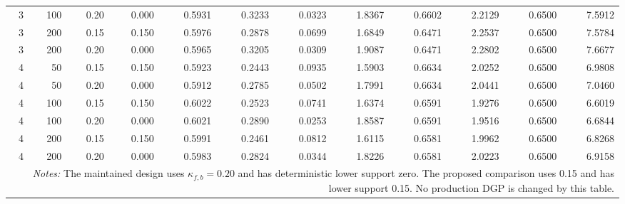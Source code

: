\begin{longtable}{rrrrrrrrrrrr}
3 & 100 & 0.20 & 0.000 & 0.5931 & 0.3233 & 0.0323 & 1.8367 & 0.6602 & 2.2129 & 0.6500 & 7.5912 \\
3 & 200 & 0.15 & 0.150 & 0.5976 & 0.2878 & 0.0699 & 1.6849 & 0.6471 & 2.2537 & 0.6500 & 7.5784 \\
3 & 200 & 0.20 & 0.000 & 0.5965 & 0.3205 & 0.0309 & 1.9087 & 0.6471 & 2.2802 & 0.6500 & 7.6677 \\
4 & 50 & 0.15 & 0.150 & 0.5923 & 0.2443 & 0.0935 & 1.5903 & 0.6634 & 2.0252 & 0.6500 & 6.9808 \\
4 & 50 & 0.20 & 0.000 & 0.5912 & 0.2785 & 0.0502 & 1.7991 & 0.6634 & 2.0441 & 0.6500 & 7.0460 \\
4 & 100 & 0.15 & 0.150 & 0.6022 & 0.2523 & 0.0741 & 1.6374 & 0.6591 & 1.9276 & 0.6500 & 6.6019 \\
4 & 100 & 0.20 & 0.000 & 0.6021 & 0.2890 & 0.0253 & 1.8587 & 0.6591 & 1.9516 & 0.6500 & 6.6844 \\
4 & 200 & 0.15 & 0.150 & 0.5991 & 0.2461 & 0.0812 & 1.6115 & 0.6581 & 1.9962 & 0.6500 & 6.8268 \\
4 & 200 & 0.20 & 0.000 & 0.5983 & 0.2824 & 0.0344 & 1.8226 & 0.6581 & 2.0223 & 0.6500 & 6.9158 \\
\bottomrule
\multicolumn{12}{p{0.96\linewidth}}{\footnotesize \textit{Notes:} The maintained design uses $\kappa_{f,b}=0.20$ and has deterministic lower support zero. The proposed comparison uses 0.15 and has lower support 0.15. No production DGP is changed by this table.} \\
\end{longtable}
\endgroup
